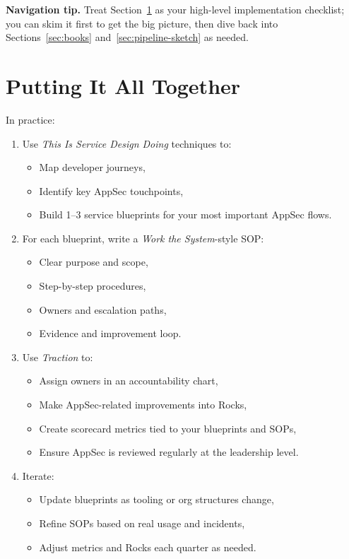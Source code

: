 \documentclass[11pt]{article}
\begin{document}
\medskip

\textbf{Navigation tip.} Treat Section~\ref{sec:together} as your high-level implementation checklist; you can skim it first to get the big picture, then dive back into Sections~\ref{sec:books} and~\ref{sec:pipeline-sketch} as needed.

\clearpage
\section{Putting It All Together}
\label{sec:together}

In practice:

\begin{enumerate}[label=\arabic*.]
  \item Use \emph{This Is Service Design Doing} techniques to:
        \begin{itemize}
          \item Map developer journeys,
          \item Identify key AppSec touchpoints,
          \item Build 1--3 service blueprints
                for your most important AppSec flows.
        \end{itemize}
  \item For each blueprint, write a \emph{Work the System}-style SOP:
        \begin{itemize}
          \item Clear purpose and scope,
          \item Step-by-step procedures,
          \item Owners and escalation paths,
          \item Evidence and improvement loop.
        \end{itemize}
  \item Use \emph{Traction} to:
        \begin{itemize}
          \item Assign owners in an accountability chart,
          \item Make AppSec-related improvements into Rocks,
          \item Create scorecard metrics tied to your blueprints and SOPs,
          \item Ensure AppSec is reviewed regularly at the leadership level.
        \end{itemize}
  \item Iterate:
        \begin{itemize}
          \item Update blueprints as tooling or org structures change,
          \item Refine SOPs based on real usage and incidents,
          \item Adjust metrics and Rocks each quarter as needed.
        \end{itemize}
\end{enumerate}
\end{document}
